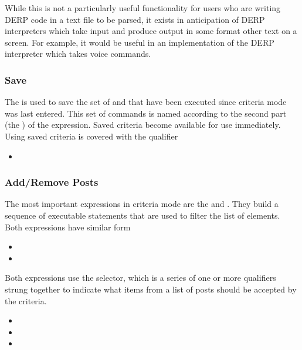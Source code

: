 While this is not a particularly useful functionality for users who are writing DERP code in a text file to be
parsed, it exists in anticipation of DERP interpreters which take input and produce output in some format other
text on a screen. For example, it would be useful in an implementation of the DERP interpreter which takes voice
commands.


\subsubsection{Save}
The  is used to save the set of  and  that have been executed since
criteria mode was last entered. This set of commands is named according to the second part (the ) of the
expression. Saved criteria become available for use immediately. Using saved criteria is covered with the  qualifier
\begin{itemize}[leftmargin=2in]
    \item[\nonterminal{save\_expression}] \bnf{:}  
\end{itemize}

\subsubsection{Add/Remove Posts}
The most important expressions in criteria mode are the  and . They build a sequence of
executable statements that are used to filter the list of elements. Both expressions have similar form
\begin{itemize}[leftmargin=2in]
    \item[\nonterminal{add\_expression}] \bnf{:}  
    \item[\nonterminal{remove\_expression}] \bnf{:}  
\end{itemize}

Both expressions use the selector, which is a series of one or more qualifiers strung together to indicate what
items from a list of posts should be accepted by the criteria.
\begin{itemize}[leftmargin=2in]
    \item[\nonterminal{selector}] \bnf{:} 
    \item[\nonterminal{qualifier\_or}] \bnf{:}    \bnf{|} 
    \item[\nonterminal{qualifier\_and}] \bnf{:}    \bnf{|} 
\end{itemize}

